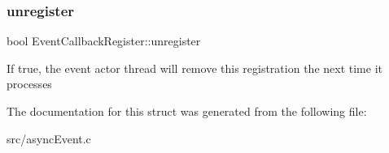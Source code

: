 \subsubsection{\texorpdfstring{unregister}{unregister}}
{\footnotesize\ttfamily bool Event\+Callback\+Register\+::unregister}

If true, the event actor thread will remove this registration the next time it processes 

The documentation for this struct was generated from the following file\+:\begin{DoxyCompactItemize}
\item 
src/async\+Event.\+c\end{DoxyCompactItemize}
